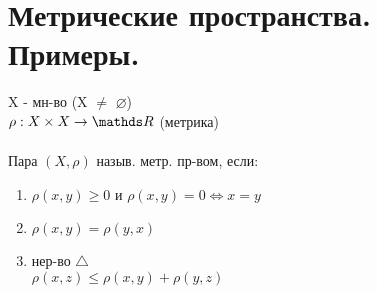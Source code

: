\documentclass[geometry.tex]{subfiles}
\begin{document}
  \section{Метрические пространства. Примеры.}

  \begin{definition}
      X - мн-во (X $\neq$ $\varnothing$) \\
      $\rho: X \times X \rightarrow \R$ (метрика)\\ \\
      Пара $(X, \rho)$ назыв. метр. пр-вом, если:
      \begin{enumerate}
          \item $\rho(x, y) \geq 0$ и $\rho(x, y) = 0 \Leftrightarrow x = y$
          \item $\rho(x, y) = \rho(y, x)$
          \item нер-во $\bigtriangleup$ \\ $\rho(x, z) \leq \rho(x, y) + \rho(y, z)$
      \end{enumerate}
  \end{definition}
\end{document}
